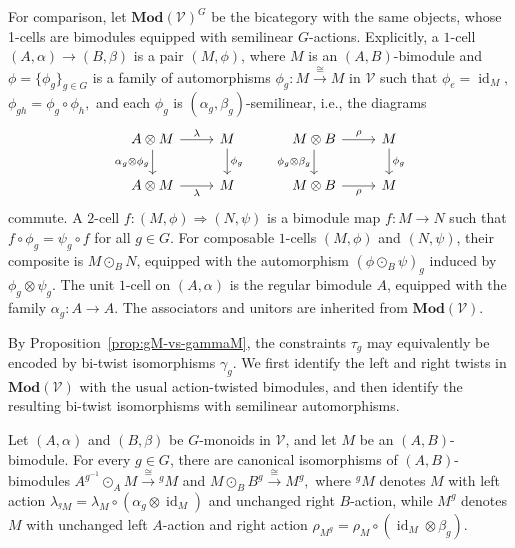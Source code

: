 \documentclass[11pt,oneside]{amsart}
\DeclareMathOperator{\id}{id}
\numberwithin{equation}{section}
\numberwithin{figure}{section}
\theoremstyle{plain}
\theoremstyle{definition}
\theoremstyle{remark}
\begin{document}
For comparison, let \(\mathbf{Mod}(\mathcal V)^G\) be the bicategory with the same objects, whose 1-cells are bimodules equipped with semilinear \(G\)-actions. Explicitly, a $1$-cell $(A,\alpha)\to (B,\beta)$ is a pair $(M,\phi)$, where $M$ is an $(A,B)$-bimodule and $\phi=\{\phi_g\}_{g\in G}$ is a family of automorphisms $\phi_g\colon M\xrightarrow{\cong} M$ in $\mathcal V$ such that \(\phi_e=\id_M,\)
\(\phi_{gh}=\phi_g\circ\phi_h,\) and each $\phi_g$ is $(\alpha_g,\beta_g)$-semilinear, i.e., the diagrams
\begin{equation}\label{eq:semilinearity-modV}
\begin{tikzcd}
A\otimes M \ar[r,"\lambda"] \ar[d,"\alpha_g\otimes \phi_g"'] & M \ar[d,"\phi_g"] \\
A\otimes M \ar[r,"\lambda"'] & M
\end{tikzcd}
\qquad
\begin{tikzcd}
M\otimes B \ar[r,"\rho"] \ar[d,"\phi_g\otimes \beta_g"'] & M \ar[d,"\phi_g"] \\
M\otimes B \ar[r,"\rho"'] & M
\end{tikzcd}
\end{equation}
commute. A $2$-cell $f\colon (M,\phi)\Rightarrow (N,\psi)$ is a bimodule map $f\colon M\to N$ such that $f\circ\phi_g=\psi_g\circ f$ for all $g\in G$. For composable $1$-cells $(M,\phi)$ and $(N,\psi)$, their composite is $M\odot_B N$, equipped with the automorphism $(\phi\odot_B\psi)_g$ induced by $\phi_g\otimes \psi_g$. The unit $1$-cell on $(A,\alpha)$ is the regular bimodule $A$, equipped with the family $\alpha_g\colon A\to A$. The associators and unitors are inherited from \(\mathbf{Mod}(\mathcal V)\).

 

 

By Proposition~\ref{prop:gM-vs-gammaM}, the constraints \(\tau_g\) may equivalently be encoded by bi-twist isomorphisms \(\gamma_{g}\). We first identify the left and right twists in \(\mathbf{Mod}(\mathcal V)\) with the usual action-twisted bimodules, and then identify the resulting bi-twist isomorphisms with semilinear automorphisms.


\begin{lemma}\label{lem:base-change-twists}
Let \((A,\alpha)\) and \((B,\beta)\) be \(G\)-monoids in
\(\mathcal V\), and let \(M\) be an \((A,B)\)-bimodule. For every
\(g\in G\), there are canonical isomorphisms of
\((A,B)\)-bimodules
\(
A^{g^{-1}}\odot_A M\xrightarrow{\cong}{}^gM
\) and
\(M\odot_B B^g\xrightarrow{\cong}M^g,
\)
where \({}^gM\) denotes \(M\) with left action
\(
\lambda_{{}^gM}
=
\lambda_M\circ(\alpha_g\otimes\id_M)
\)
and unchanged right \(B\)-action, while \(M^g\) denotes \(M\) with
unchanged left \(A\)-action and right action
\(
\rho_{M^g}
=
\rho_M\circ(\id_M\otimes\beta_g).
\)
\end{lemma}
\end{document}
